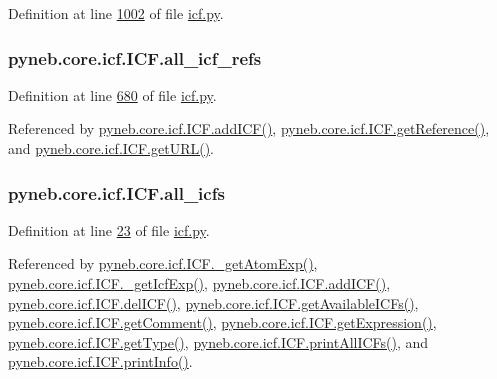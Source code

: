 Definition at line \hyperlink{icf_8py_source_l01002}{1002} of file \hyperlink{icf_8py_source}{icf.\-py}.

\hypertarget{classpyneb_1_1core_1_1icf_1_1_i_c_f_a9777abc7cc843cd5c4d8c5810c1b2ed1}{
\subsubsection[{all\-\_\-icf\-\_\-refs}]{\setlength{\rightskip}{0pt plus 5cm}pyneb.\-core.\-icf.\-I\-C\-F.\-all\-\_\-icf\-\_\-refs}}\label{classpyneb_1_1core_1_1icf_1_1_i_c_f_a9777abc7cc843cd5c4d8c5810c1b2ed1}


Definition at line \hyperlink{icf_8py_source_l00680}{680} of file \hyperlink{icf_8py_source}{icf.\-py}.



Referenced by \hyperlink{icf_8py_source_l00797}{pyneb.\-core.\-icf.\-I\-C\-F.\-add\-I\-C\-F()}, \hyperlink{icf_8py_source_l00878}{pyneb.\-core.\-icf.\-I\-C\-F.\-get\-Reference()}, and \hyperlink{icf_8py_source_l00896}{pyneb.\-core.\-icf.\-I\-C\-F.\-get\-U\-R\-L()}.

\hypertarget{classpyneb_1_1core_1_1icf_1_1_i_c_f_a854ee87a53feb102e429e902227ce88b}{
\subsubsection[{all\-\_\-icfs}]{\setlength{\rightskip}{0pt plus 5cm}pyneb.\-core.\-icf.\-I\-C\-F.\-all\-\_\-icfs}}\label{classpyneb_1_1core_1_1icf_1_1_i_c_f_a854ee87a53feb102e429e902227ce88b}


Definition at line \hyperlink{icf_8py_source_l00023}{23} of file \hyperlink{icf_8py_source}{icf.\-py}.



Referenced by \hyperlink{icf_8py_source_l00730}{pyneb.\-core.\-icf.\-I\-C\-F.\-\_\-get\-Atom\-Exp()}, \hyperlink{icf_8py_source_l00738}{pyneb.\-core.\-icf.\-I\-C\-F.\-\_\-get\-Icf\-Exp()}, \hyperlink{icf_8py_source_l00797}{pyneb.\-core.\-icf.\-I\-C\-F.\-add\-I\-C\-F()}, \hyperlink{icf_8py_source_l00838}{pyneb.\-core.\-icf.\-I\-C\-F.\-del\-I\-C\-F()}, \hyperlink{icf_8py_source_l00746}{pyneb.\-core.\-icf.\-I\-C\-F.\-get\-Available\-I\-C\-Fs()}, \hyperlink{icf_8py_source_l00943}{pyneb.\-core.\-icf.\-I\-C\-F.\-get\-Comment()}, \hyperlink{icf_8py_source_l00914}{pyneb.\-core.\-icf.\-I\-C\-F.\-get\-Expression()}, \hyperlink{icf_8py_source_l00932}{pyneb.\-core.\-icf.\-I\-C\-F.\-get\-Type()}, \hyperlink{icf_8py_source_l00780}{pyneb.\-core.\-icf.\-I\-C\-F.\-print\-All\-I\-C\-Fs()}, and \hyperlink{icf_8py_source_l00853}{pyneb.\-core.\-icf.\-I\-C\-F.\-print\-Info()}.

